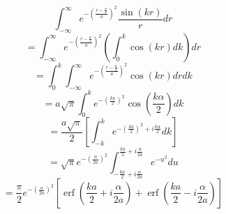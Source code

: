 \documentclass[12pt]{article}
\begin{document}
\[{}\]
\begin{equation}{\int_{-\infty}^{\infty}{e^{-\left(\frac{r-\frac{\alpha}{2}}{a}\right)^2}\frac{\sin(kr)}{r}d{r}}}\end{equation} 
\begin{displaymath}{=\int_{-\infty}^{\infty}{e^{-\left(\frac{r-\frac{\alpha}{2}}{a}\right)^2}\left(\int_{0}^{k}{\cos(kr)d{k}}\right)d{r}}}\end{displaymath} 
\begin{displaymath}{=\int_{0}^{k}\int_{-\infty}^{\infty}{e^{-\left(\frac{r-\frac{\alpha}{2}}{a}\right)^2}{\cos(kr)d{r}}d{k}}}\end{displaymath} 
\begin{displaymath}{=a\sqrt{\pi}\int_{0}^{k}e^{-\left(\frac{ka}{2}\right)^2}\cos\left(\frac{k\alpha}{2}\right)d{k} }\end{displaymath} 
\begin{displaymath}{=\frac{a\sqrt{\pi}}{2}\left[\int_{-k}^{k}e^{-\left(\frac{ka}{2}\right)^2 + i\frac{k\alpha}{2}}d{k}\right]}\end{displaymath} 
\begin{displaymath}{=\sqrt{\pi}e^{-\left(\frac{\alpha}{2a}\right)^2}\int_{-\frac{ka}{2}+i\frac{\alpha}{2a}}^{\frac{ka}{2}+i\frac{\alpha}{2a}}e^{-u^2}d{u}}\end{displaymath} 
\begin{equation}{=\frac{\pi}{2}e^{-\left(\frac{\alpha}{2a}\right)^2}\left[\operatorname{erf}\left(\frac{ka}{2}+i\frac{\alpha}{2a}\right)+\operatorname{erf}\left(\frac{ka}{2}-i\frac{\alpha}{2a}\right)\right]}\end{equation} 
\end{document}
